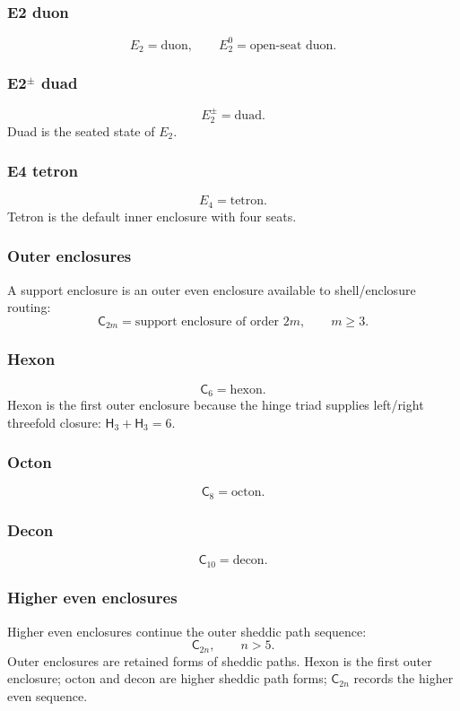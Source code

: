 \subsubsection{E2 duon}
\label{subsec:e2-duon}
\[
E_2=\mathrm{duon},
\qquad
E_2^0=\text{open-seat duon}.
\]

\subsubsection{E2\texorpdfstring{\(^{\pm}\)}{±} duad}
\label{subsec:e2-duad}
\[
E_2^{\pm}=\mathrm{duad}.
\]
Duad is the seated state of \(E_2\).

\subsubsection{E4 tetron}
\label{subsec:e4-tetron}
\[
E_4=\mathrm{tetron}.
\]
Tetron is the default inner enclosure with four seats.

\subsubsection{Outer enclosures}
\label{subsec:outer-enclosures}
A support enclosure is an outer even enclosure available to shell/enclosure routing:
\[
\mathsf C_{2m}=\text{support enclosure of order }2m,
\qquad m\ge3.
\]

\subsubsection{Hexon}
\label{subsec:hexon}
\[
\mathsf C_6=\mathrm{hexon}.
\]
Hexon is the first outer enclosure because the hinge triad supplies left/right threefold closure: \(\mathsf H_3+\mathsf H_3=6\).

\subsubsection{Octon}
\label{subsec:octon}
\[
\mathsf C_8=\mathrm{octon}.
\]

\subsubsection{Decon}
\label{subsec:decon}
\[
\mathsf C_{10}=\mathrm{decon}.
\]

\subsubsection{Higher even enclosures}
\label{subsec:higher-even-enclosures}
Higher even enclosures continue the outer sheddic path sequence:
\[
\mathsf C_{2n},
\qquad n>5.
\]
Outer enclosures are retained forms of sheddic paths. Hexon is the first outer enclosure; octon and decon are higher sheddic path forms; \(\mathsf C_{2n}\) records the higher even sequence.

